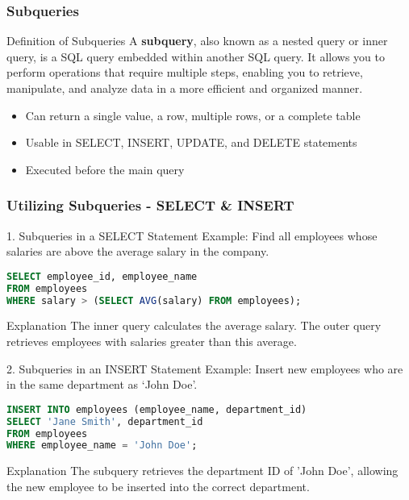 \documentclass[aspectratio=169]{beamer}
\begin{document}
\begin{frame}[fragile]
    \frametitle{Subqueries}
    \begin{block}{Definition of Subqueries}
    A \textbf{subquery}, also known as a nested query or inner query, is a SQL query embedded within another SQL query. It allows you to perform operations that require multiple steps, enabling you to retrieve, manipulate, and analyze data in a more efficient and organized manner.
    \end{block}
    \begin{itemize}
        \item Can return a single value, a row, multiple rows, or a complete table
        \item Usable in SELECT, INSERT, UPDATE, and DELETE statements
        \item Executed before the main query
    \end{itemize}
\end{frame}

\begin{frame}[fragile]
    \frametitle{Utilizing Subqueries - SELECT & INSERT}
    
    \begin{block}{1. Subqueries in a SELECT Statement}
    Example: Find all employees whose salaries are above the average salary in the company.
    \begin{lstlisting}[language=SQL]
SELECT employee_id, employee_name 
FROM employees 
WHERE salary > (SELECT AVG(salary) FROM employees);
    \end{lstlisting}
    \end{block}
    \begin{block}{Explanation}
    The inner query calculates the average salary. The outer query retrieves employees with salaries greater than this average.
    \end{block}

    \begin{block}{2. Subqueries in an INSERT Statement}
    Example: Insert new employees who are in the same department as ‘John Doe’.
    \begin{lstlisting}[language=SQL]
INSERT INTO employees (employee_name, department_id) 
SELECT 'Jane Smith', department_id 
FROM employees 
WHERE employee_name = 'John Doe';
    \end{lstlisting}
    \end{block}
    \begin{block}{Explanation}
    The subquery retrieves the department ID of 'John Doe', allowing the new employee to be inserted into the correct department.
    \end{block}
\end{frame}
\end{document}
